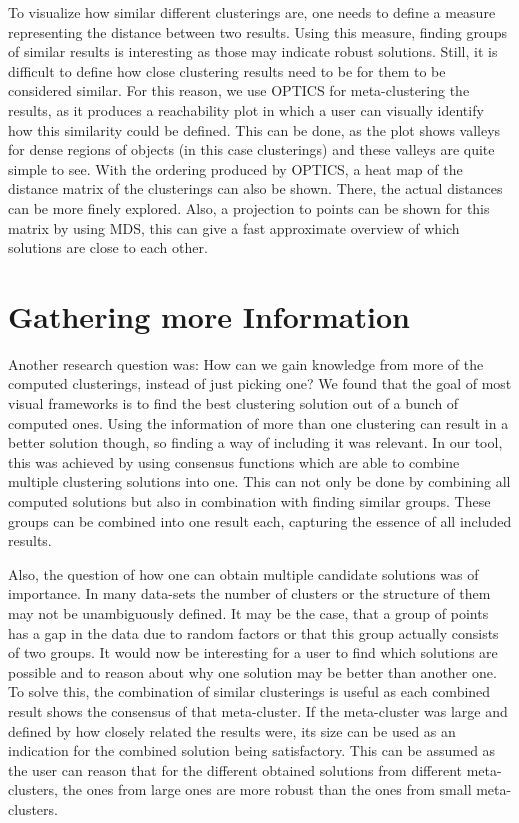 \documentclass[
	a4paper,
	english,
	twoside,
	openright,               
	11pt                            
	]{report}
\begin{document}
To visualize how similar different clusterings are, one needs to define a measure representing the distance between two results. Using this measure, finding groups of similar results is interesting as those may indicate robust solutions. Still, it is difficult to define how close clustering results need to be for them to be considered similar. For this reason, we use OPTICS for meta-clustering the results, as it produces a reachability plot in which a user can visually identify how this similarity could be defined. This can be done, as the plot shows valleys for dense regions of objects (in this case clusterings) and these valleys are quite simple to see. With the ordering produced by OPTICS, a heat map of the distance matrix of the clusterings can also be shown. There, the actual distances can be more finely explored. Also, a projection to points can be shown for this matrix by using MDS, this can give a fast approximate overview of which solutions are close to each other.

\section{Gathering more Information}
Another research question was: How can we gain knowledge from more of the computed clusterings, instead of just picking one? We found that the goal of most visual frameworks is to find the best clustering solution out of a bunch of computed ones. Using the information of more than one clustering can result in a better solution though, so finding a way of including it was relevant. In our tool, this was achieved by using consensus functions which are able to combine multiple clustering solutions into one. This can not only be done by combining all computed solutions but also in combination with finding similar groups. These groups can be combined into one result each, capturing the essence of all included results.

Also, the question of how one can obtain multiple candidate solutions was of importance. In many data-sets the number of clusters or the structure of them may not be unambiguously defined. It may be the case, that a group of points has a gap in the data due to random factors or that this group actually consists of two groups. It would now be interesting for a user to find which solutions are possible and to reason about why one solution may be better than another one. To solve this, the combination of similar clusterings is useful as each combined result shows the consensus of that meta-cluster. If the meta-cluster was large and defined by how closely related the results were, its size can be used as an indication for the combined solution being satisfactory. This can be assumed as the user can reason that for the different obtained solutions from different meta-clusters, the ones from large ones are more robust than the ones from small meta-clusters.
\end{document}
